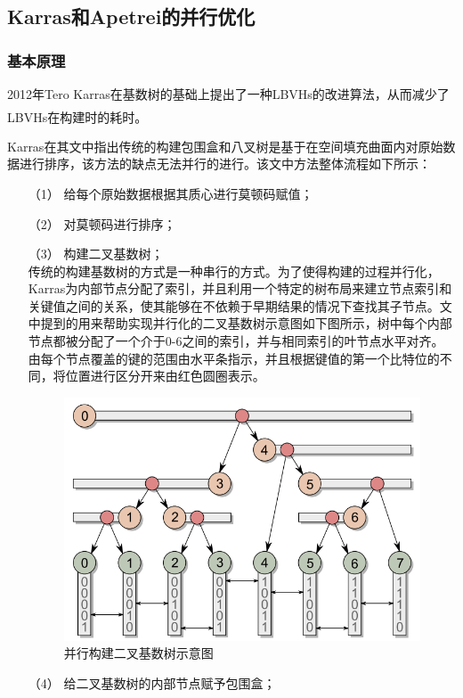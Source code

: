 \documentclass[11pt]{article}
\newcommand{\upcite}[1]{\textsuperscript{\textsuperscript{\cite{#1}}}}
\begin{document}
\subsection{Karras和Apetrei的并行优化}
\subsubsection{基本原理}
2012年Tero Karras在基数树的基础上提出了一种LBVHs的改进算法，从而减少了LBVHs在构建时的耗时\upcite{karras}。
\par Karras在其文中指出传统的构建包围盒和八叉树是基于在空间填充曲面内对原始数据进行排序，该方法的缺点无法并行的进行。该文中方法整体流程如下所示：
\begin{itemize}
\item[（1）]{给每个原始数据根据其质心进行莫顿码赋值；}
\item[（2）]{对莫顿码进行排序；}
\item[（3）]{构建二叉基数树；} \mbox{} \\
传统的构建基数树的方式是一种串行的方式。为了使得构建的过程并行化，Karras为内部节点分配了索引，并且利用一个特定的树布局来建立节点索引和关键值之间的关系，使其能够在不依赖于早期结果的情况下查找其子节点。文中提到的用来帮助实现并行化的二叉基数树示意图如下图所示，树中每个内部节点都被分配了一个介于0-6之间的索引，并与相同索引的叶节点水平对齐。 由每个节点覆盖的键的范围由水平条指示，并且根据键值的第一个比特位的不同，将位置进行区分开来由红色圆圈表示。
\begin{figure}[H]
\begin{center}
\includegraphics[scale=0.5]{parallel_binary_radix_tree.png}
\caption{并行构建二叉基数树示意图}
\end{center}
\end{figure}
\item[（4）]{给二叉基数树的内部节点赋予包围盒；}
\end{itemize}
\end{document}
